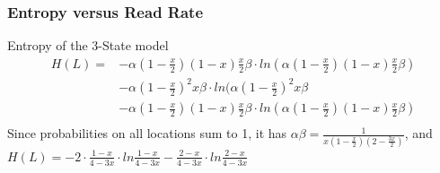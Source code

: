 
\begin{frame}
\frametitle{Entropy versus Read Rate}



\vspace{-10pt}
\begin{block}{Entropy of the 3-State model}
  \begin{equation}
    \begin{split}
      H(L) = & - \alpha(1-\frac{x}{2})(1-x)\frac{x}{2}\beta \cdot ln(\alpha(1-\frac{x}{2})(1-x)\frac{x}{2}\beta) \\
             & - \alpha(1-\frac{x}{2})^2x\beta \cdot ln(\alpha(1-\frac{x}{2})^2x\beta \\
             & - \alpha(1-\frac{x}{2})(1-x)\frac{x}{2}\beta \cdot ln(\alpha(1-\frac{x}{2})(1-x)\frac{x}{2}\beta) \\
    \end{split}
  \end{equation}
  Since probabilities on all locations sum to 1, it has $\alpha\beta = \frac{1}{x(1-\frac{x}{2})(2-\frac{3x}{2})}$, and $  H(L) = -2 \cdot \frac{1-x}{4-3x} \cdot ln\frac{1-x}{4-3x} - \frac{2-x}{4-3x} \cdot ln\frac{2-x}{4-3x} $
\end{block}
\end{frame}


